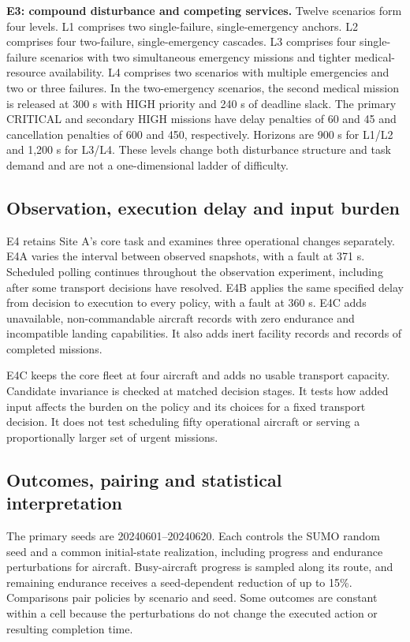 \documentclass[]{interact}
\theoremstyle{plain}
\theoremstyle{definition}
\theoremstyle{remark}
\begin{document}
\textbf{E3: compound disturbance and competing services.} Twelve scenarios form four levels. L1 comprises two single-failure, single-emergency anchors. L2 comprises four two-failure, single-emergency cascades. L3 comprises four single-failure scenarios with two simultaneous emergency missions and tighter medical-resource availability. L4 comprises two scenarios with multiple emergencies and two or three failures. In the two-emergency scenarios, the second medical mission is released at 300 s with HIGH priority and 240 s of deadline slack. The primary CRITICAL and secondary HIGH missions have delay penalties of 60 and 45 and cancellation penalties of 600 and 450, respectively. Horizons are 900 s for L1/L2 and 1,200 s for L3/L4. These levels change both disturbance structure and task demand and are not a one-dimensional ladder of difficulty.

\subsection{Observation, execution delay and input burden}

E4 retains Site A's core task and examines three operational changes separately. E4A varies the interval between observed snapshots, with a fault at 371 s. Scheduled polling continues throughout the observation experiment, including after some transport decisions have resolved. E4B applies the same specified delay from decision to execution to every policy, with a fault at 360 s. E4C adds unavailable, non-commandable aircraft records with zero endurance and incompatible landing capabilities. It also adds inert facility records and records of completed missions.

E4C keeps the core fleet at four aircraft and adds no usable transport capacity. Candidate invariance is checked at matched decision stages. It tests how added input affects the burden on the policy and its choices for a fixed transport decision. It does not test scheduling fifty operational aircraft or serving a proportionally larger set of urgent missions.

\subsection{Outcomes, pairing and statistical interpretation}

The primary seeds are 20240601--20240620. Each controls the SUMO random seed and a common initial-state realization, including progress and endurance perturbations for aircraft. Busy-aircraft progress is sampled along its route, and remaining endurance receives a seed-dependent reduction of up to 15\%. Comparisons pair policies by scenario and seed. Some outcomes are constant within a cell because the perturbations do not change the executed action or resulting completion time.
\end{document}
